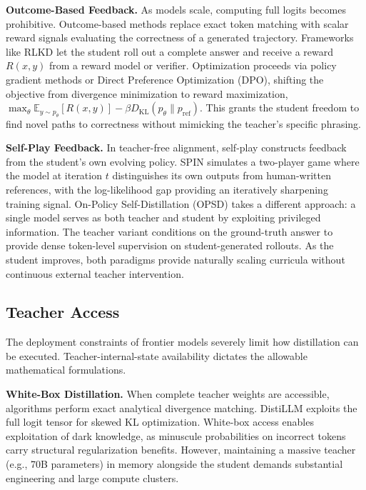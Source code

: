 \documentclass{article} %
\newcommand{\KL}{D_{\mathrm{KL}}}
\newcommand{\ptheta}{p_\theta}
\begin{document}
\textbf{Outcome-Based Feedback.} As models scale, computing full logits becomes prohibitive. Outcome-based methods replace exact token matching with scalar reward signals evaluating the correctness of a generated trajectory. Frameworks like RLKD \citep{2505.16142} let the student roll out a complete answer and receive a reward $R(x, y)$ from a reward model or verifier. Optimization proceeds via policy gradient methods or Direct Preference Optimization (DPO), shifting the objective from divergence minimization to reward maximization, $\max_\theta \mathbb{E}_{y \sim \ptheta} [R(x, y)] - \beta \KL(\ptheta \parallel p_{\mathrm{ref}})$. This grants the student freedom to find novel paths to correctness without mimicking the teacher's specific phrasing.

\textbf{Self-Play Feedback.} In teacher-free alignment, self-play constructs feedback from the student's own evolving policy. SPIN \citep{2401.01335} simulates a two-player game where the model at iteration $t$ distinguishes its own outputs from human-written references, with the log-likelihood gap providing an iteratively sharpening training signal. On-Policy Self-Distillation (OPSD) \citep{2601.18734} takes a different approach: a single model serves as both teacher and student by exploiting privileged information. The teacher variant conditions on the ground-truth answer to provide dense token-level supervision on student-generated rollouts. As the student improves, both paradigms provide naturally scaling curricula without continuous external teacher intervention.

\subsection{Teacher Access}
\label{subsec:tax_access}

The deployment constraints of frontier models severely limit how distillation can be executed. Teacher-internal-state availability dictates the allowable mathematical formulations.

\textbf{White-Box Distillation.} When complete teacher weights are accessible, algorithms perform exact analytical divergence matching. DistiLLM \citep{2402.03898} exploits the full logit tensor for skewed KL optimization. White-box access enables exploitation of dark knowledge, as minuscule probabilities on incorrect tokens carry structural regularization benefits. However, maintaining a massive teacher (e.g., 70B parameters) in memory alongside the student demands substantial engineering and large compute clusters.
\end{document}
